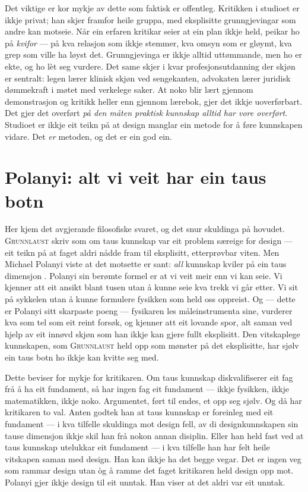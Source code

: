 Det viktige er kor mykje av dette som faktisk er offentleg. Kritikken i studioet er ikkje privat; han skjer framfor heile gruppa, med eksplisitte grunngjevingar som andre kan motseie. Når ein erfaren kritikar seier at ein plan ikkje held, peikar ho på \emph{kvifor} — på kva relasjon som ikkje stemmer, kva omsyn som er gløymt, kva grep som ville ha løyst det. Grunngjevinga er ikkje alltid uttømmande, men ho er ekte, og ho lèt seg vurdere. Det same skjer i kvar profesjonsutdanning der skjøn er sentralt: legen lærer klinisk skjøn ved sengekanten, advokaten lærer juridisk dømmekraft i møtet med verkelege saker. At noko blir lært gjennom demonstrasjon og kritikk heller enn gjennom lærebok, gjer det ikkje uoverførbart. Det gjer det overført \emph{på den måten praktisk kunnskap alltid har vore overført}. Studioet er ikkje eit teikn på at design manglar ein metode for å føre kunnskapen vidare. Det \emph{er} metoden, og det er ein god ein.

\section{Polanyi: alt vi veit har ein taus botn}

Her kjem det avgjerande filosofiske svaret, og det snur skuldinga på hovudet. \textsc{Grunnlaust} skriv som om taus kunnskap var eit problem særeige for design — eit teikn på at faget aldri nådde fram til eksplisitt, etterprøvbar viten. Men Michael Polanyi viste at det motsette er sant: \emph{all} kunnskap kviler på ein taus dimensjon \autocite{polanyi1966tacit}. Polanyi sin berømte formel er at vi veit meir enn vi kan seie. Vi kjenner att eit ansikt blant tusen utan å kunne seie kva trekk vi går etter. Vi sit på sykkelen utan å kunne formulere fysikken som held oss oppreist. Og — dette er Polanyi sitt skarpaste poeng — fysikaren les måleinstrumenta sine, vurderer kva som tel som eit reint forsøk, og kjenner att eit lovande spor, alt saman ved hjelp av eit innøvd skjøn som han ikkje kan gjere fullt eksplisitt. Den vitskaplege kunnskapen, som \textsc{Grunnlaust} held opp som mønster på det eksplisitte, har sjølv ein taus botn ho ikkje kan kvitte seg med.

Dette beviser for mykje for kritikaren. Om taus kunnskap diskvalifiserer eit fag frå å ha eit fundament, så har ingen fag eit fundament — ikkje fysikken, ikkje matematikken, ikkje noko. Argumentet, ført til endes, et opp seg sjølv. Og då har kritikaren to val. Anten godtek han at taus kunnskap er foreinleg med eit fundament — i kva tilfelle skuldinga mot design fell, av di designkunnskapen sin tause dimensjon ikkje skil han frå nokon annan disiplin. Eller han held fast ved at taus kunnskap utelukkar eit fundament — i kva tilfelle han har felt heile vitskapen saman med design. Han kan ikkje ha det begge vegar. Det er ingen veg som rammar design utan òg å ramme det faget kritikaren held design opp mot. Polanyi gjer ikkje design til eit unntak. Han viser at det aldri var eit unntak.

